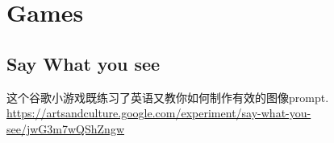 \documentclass[11pt]{article}
\date{\today}
\title{}
\begin{document}
\tableofcontents


\section{Games}
\label{sec:org93e6df5}
\subsection{Say What you see}
\label{sec:org1a6a905}
这个谷歌小游戏既练习了英语又教你如何制作有效的图像prompt. \\
\url{https://artsandculture.google.com/experiment/say-what-you-see/jwG3m7wQShZngw}
\end{document}
